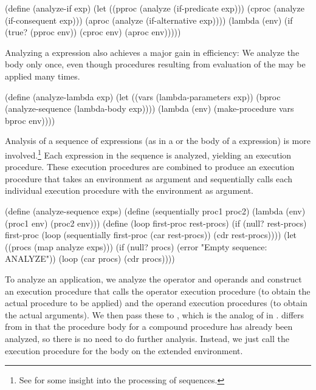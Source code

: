 \begin{codeBlock}
(define (analyze-if exp)
  (let ((pproc (analyze (if-predicate exp)))
        (cproc (analyze (if-consequent exp)))
        (aproc (analyze (if-alternative exp))))
    (lambda (env) (if (true? (pproc env))
                      (cproc env)
                      (aproc env)))))
\end{codeBlock}

\noindent
Analyzing a  expression also achieves a major gain in efficiency:
We analyze the  body only once, even though procedures resulting
from evaluation of the  may be applied many times.

\begin{codeBlock}
(define (analyze-lambda exp)
  (let ((vars (lambda-parameters exp))
        (bproc (analyze-sequence (lambda-body exp))))
    (lambda (env) (make-procedure vars bproc env))))
\end{codeBlock}

\noindent
Analysis of a sequence of expressions (as in a  or the body of a
 expression) is more involved.\footnote{See 
for some insight into the processing of sequences.} Each expression in the
sequence is analyzed, yielding an execution procedure.  These execution
procedures are combined to produce an execution procedure that takes an
environment as argument and sequentially calls each individual execution
procedure with the environment as argument.

\begin{codeBlock}
(define (analyze-sequence exps)
  (define (sequentially proc1 proc2)
    (lambda (env) (proc1 env) (proc2 env)))
  (define (loop first-proc rest-procs)
    (if (null? rest-procs)
        first-proc
        (loop (sequentially first-proc
                            (car rest-procs))
              (cdr rest-procs))))
  (let ((procs (map analyze exps)))
    (if (null? procs)
      (error "Empty sequence: ANALYZE"))
    (loop (car procs) (cdr procs))))
\end{codeBlock}

\noindent
To analyze an application, we analyze the operator and operands and construct
an execution procedure that calls the operator execution procedure (to obtain
the actual procedure to be applied) and the operand execution procedures (to
obtain the actual arguments).  We then pass these to
, which is the analog of  in
.   differs from  in that the
procedure body for a compound procedure has already been analyzed, so there is
no need to do further analysis.  Instead, we just call the execution procedure
for the body on the extended environment.

